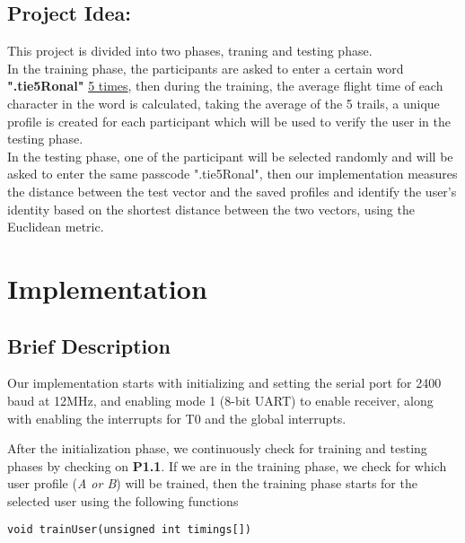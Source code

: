 \documentclass[runningheads]{llncs}
\begin{document}
\subsection{Project Idea:} 
This project is divided into two phases, traning and testing phase. \\

In the training phase, the participants are asked to enter a certain word \textbf{".tie5Ronal"} \underline{5 times}, then during the training, the average flight time of each character in the word is calculated, taking the average of the 5 trails, a unique profile is created for each participant which will be used to verify the user in the testing phase. \\

In the testing phase, one of the participant will be selected randomly and will be asked to enter the same passcode ".tie5Ronal", then our implementation measures the distance between the test vector and the saved profiles and identify the user's identity based on the shortest distance between the two vectors, using the Euclidean metric. \newline \newline \newline

%
%
%

\section{Implementation}

\subsection{Brief Description}
Our implementation starts with initializing and setting the serial port for 2400 baud at 12MHz, and enabling mode 1 (8-bit UART) to enable receiver, along with enabling the interrupts for T0 and the global interrupts. \newline \newline 

After the initialization phase, we continuously check for training and testing phases by checking on \textbf{P1.1}. If we are in the training phase, we check for which user profile (\textit{A or B}) will be trained, then the training phase starts for the selected user using the following functions 

\begin{lstlisting}[style=CStyle]
void trainUser(unsigned int timings[])
\end{lstlisting}
\end{document}
